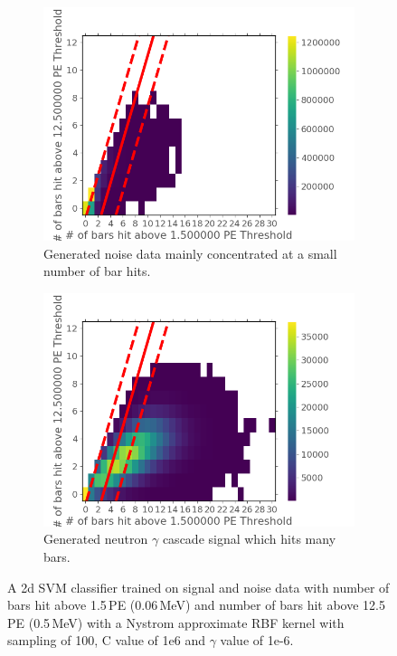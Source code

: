 \begin{figure}[htbp]
\centering
\begin{subfigure}{.5\textwidth}
  \centering
  \includegraphics[width=\linewidth]{Chapter4/Figs/Raster/noiseNeutronSVM_C1e6_g1e-6.png}
  \captionsetup{width=.9\linewidth}
  \caption{Generated noise data mainly concentrated at a small number of bar hits.}
  \label{subFig:noiseNeutronSVM_C1e6_g1e-6}
\end{subfigure}%
\begin{subfigure}{.5\textwidth}
  \centering
  \includegraphics[width=\linewidth]{Chapter4/Figs/Raster/signalNeutronSVM_C1e6_g1e-6.png}
  \captionsetup{width=.9\linewidth}
  \caption{Generated neutron $\gamma$ cascade signal which hits many bars.}
  \label{subFig:signalNeutronSVM_C1e6_g1e-6}
\end{subfigure}
\caption{A 2d SVM classifier trained on signal and noise data with number of bars hit above 1.5\,PE (0.06\,MeV) and number of bars hit above 12.5\,PE (0.5\,MeV) with a Nystrom approximate RBF kernel with sampling of 100, C value of 1e6 and $\gamma$ value of 1e-6.}
\label{fig:signalAndNoiseNeutronSVM_C1e6_g1e-6}
\end{figure}


